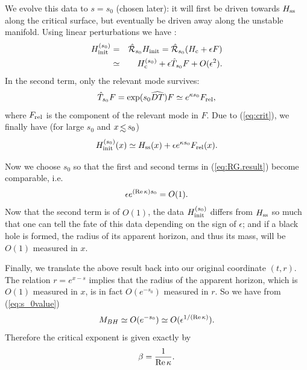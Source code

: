 We evolve this data to $s = s_0$ (chosen later):
it will first be driven
towards $H_{\rm ss}$ along the critical surface, but eventually be
driven away along the unstable manifold.
Using linear perturbations we have \cite{footnote1}:
\begin{eqnarray}
        H^{(s_0)}_{\rm init} & = &  \hat{\cal R}_{s_0} H_{\rm init}
        = \hat{\cal R}_{s_0} ( H_{\rm c} + \epsilon F )
        \nonumber \\
        & \simeq & H_{\rm c}^{(s_0)} + \epsilon \hat{T}_{s_0} F
        + O(\epsilon^2).
        \label{eq:lin1}
\end{eqnarray}
In the second term, only the relevant mode survives:
\begin{equation}
        \hat T_{s_0} F =
        \exp(s_0 \widehat{D T})F \simeq
        e^{\kappa s_0}  F_{\rm rel},
\end{equation}
where  $F_{\rm rel}$ is the component of the relevant mode
in $F$.
Due to (\ref{eq:crit}), we finally have (for large $s_0$ and
$x \, \raisebox{+0.1ex}{$<$} \hspace{-0.8em} \raisebox{-1ex}{$\sim$} \,  s_0$)
\begin{equation}
        H^{(s_0)}_{\rm init}(x) \simeq
        H_{\rm ss}(x) + \epsilon e^{\kappa s_0 }F_{\rm rel}(x).
        \label{eq:RG.result}
\end{equation}

Now we choose $s_0$ so that
the first and second terms in (\ref{eq:RG.result}) become
comparable, i.e.
\begin{equation}
        \label{eq:s_0value}
        \epsilon e^{ ({\rm Re \, } \kappa) s_0} = O(1).
\end{equation}
Now that the second term is of $O(1)$,
the data $H^{(s_0)}_{\rm init}$ differs from $H_{\rm ss}$
so much that
one can tell the fate of this data depending on the sign of $\epsilon$;
and if a
black hole is formed, the radius of its apparent horizon,
and thus its mass,  will be $O(1)$ measured in $x$.

Finally, we translate the above result back into our original coordinate
$(t,r)$.
The relation $r = e^{x-s}$ implies
that the radius of the apparent horizon, which is $O(1)$ measured in $x$,
is in fact $O(e^{-s_0})$ measured in $r$.
So we have from (\ref{eq:s_0value})
\begin{equation}
         M_{BH} \simeq O(e^{-s_0}) \simeq
	O(\epsilon^{ 1/ ({\rm Re \,}\kappa)}   ).
         \label{eq:MBH}
\end{equation}
Therefore the critical exponent is given exactly by
\begin{equation}
         \beta =  \frac{1}{{\rm Re \,} \kappa}  .
         \label{eq:beta.exp}
\end{equation}


